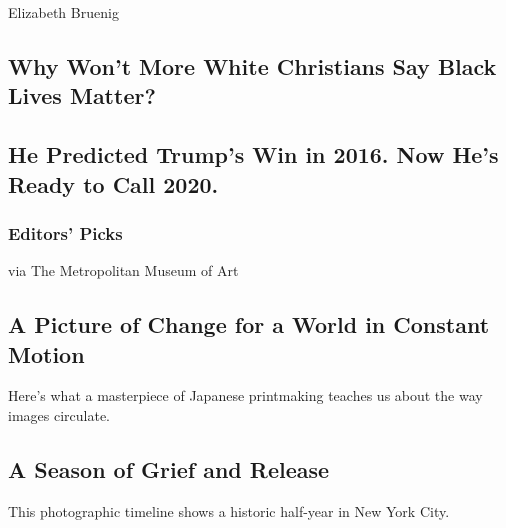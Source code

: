 Elizabeth Bruenig

\hypertarget{why-wont-more-white-christians-say-black-lives-matter}{%
\subsection{Why Won't More White Christians Say Black Lives
Matter?}\label{why-wont-more-white-christians-say-black-lives-matter}}

\href{/video/opinion/100000007227782/2020-election-prediction-allan-lichtman.html}{}

\hypertarget{he-predicted-trumps-win-in-2016-now-hes-ready-to-call-2020}{%
\subsection{He Predicted Trump's Win in 2016. Now He's Ready to Call
2020.}\label{he-predicted-trumps-win-in-2016-now-hes-ready-to-call-2020}}

\hypertarget{editors-picks}{%
\subsubsection{Editors' Picks}\label{editors-picks}}

\href{/interactive/2020/08/07/arts/design/hokusai-fuji.html}{}

via The Metropolitan Museum of Art

\href{/interactive/2020/08/07/arts/design/hokusai-fuji.html}{}

\hypertarget{a-picture-of-change-for-a-world-in-constant-motion}{%
\subsection{A Picture of Change for a World in Constant
Motion}\label{a-picture-of-change-for-a-world-in-constant-motion}}

Here's what a masterpiece of Japanese printmaking teaches us about the
way images circulate.

\href{/2020/08/07/style/coronavirus-nyc-historic-season.html}{}

\hypertarget{a-season-of-grief-and-release}{%
\subsection{A Season of Grief and
Release}\label{a-season-of-grief-and-release}}

This photographic timeline shows a historic half-year in New York City.

